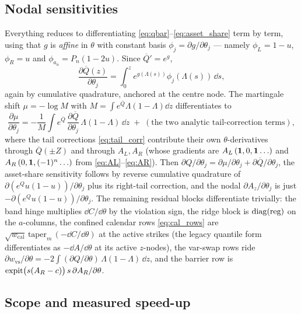 \documentclass[11pt]{article}
\begin{document}
\subsection{Nodal sensitivities}

Everything reduces to differentiating \eqref{eq:qbar}--\eqref{eq:asset_share}
term by term, using that $g$ is \emph{affine} in $\theta$ with constant basis
$\phi_j=\partial g/\partial\theta_j$ --- namely $\phi_L=1-u$, $\phi_R=u$ and
$\phi_{a_n}=P_n(1-2u)$. Since $\overline Q'=e^{g}$,
\begin{equation}
\frac{\partial\overline Q(z)}{\partial\theta_j}
=\int_0^z e^{g(\Lambda(s))}\phi_j(\Lambda(s))\,\dd s,
\end{equation}
again by cumulative quadrature, anchored at the centre node. The martingale shift
$\mu=-\log M$ with $M=\int e^{\overline Q}\Lambda(1-\Lambda)\dd z$ differentiates to
\begin{equation}
\frac{\partial\mu}{\partial\theta_j}=-\frac{1}{M}\int e^{\overline Q}\,\frac{\partial\overline Q}{\partial\theta_j}\,\Lambda(1-\Lambda)\,\dd z
\;+\;(\text{the two analytic tail-correction terms}),
\end{equation}
where the tail corrections \eqref{eq:tail_corr} contribute their own
$\theta$-derivatives through $\overline Q(\pm Z)$ and through $A_L,A_R$ (whose
gradients are $A_L\,(\mathbf{1},0,\mathbf{1}\ldots)$ and $A_R\,(0,\mathbf{1},(-1)^n\ldots)$ from
\eqref{eq:AL}--\eqref{eq:AR}). Then $\partial Q/\partial\theta_j=\partial\mu/\partial\theta_j+\partial\overline Q/\partial\theta_j$,
the asset-share sensitivity follows by reverse cumulative quadrature of
$\partial(e^{Q}u(1-u))/\partial\theta_j$ plus its right-tail correction, and the
nodal $\partial A_z/\partial\theta_j$ is just $-\partial(e^{Q}u(1-u))/\partial\theta_j$.
The remaining residual blocks differentiate trivially: the band hinge multiplies
$\dd C/\dd\theta$ by the violation sign, the ridge block is $\operatorname{diag}(\text{reg})$ on
the $a$-columns, the confined calendar rows \eqref{eq:cal_rows} are
$\sqrt{w_{\text{cal}}}\,\mathrm{taper}_m\,(-\dd C/\dd\theta)$ at the active
strikes (the legacy quantile form differentiates as $-\dd A/\dd\theta$ at its
active $z$-nodes), the var-swap rows ride
$\partial w_{\text{vs}}/\partial\theta
=-2\int(\partial Q/\partial\theta)\,\Lambda(1-\Lambda)\,\dd z$, and the
barrier row is $\operatorname{expit}\!\big(s(A_R-c)\big)\,s\,\partial A_R/\partial\theta$.

\subsection{Scope and measured speed-up}
\end{document}
